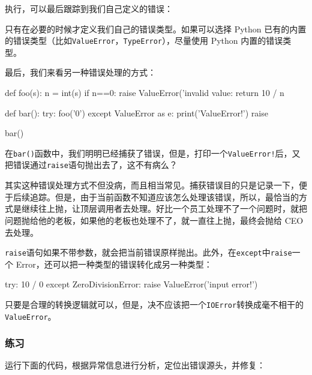 执行，可以最后跟踪到我们自己定义的错误：


只有在必要的时候才定义我们自己的错误类型。如果可以选择 Python
已有的内置的错误类型（比如\texttt{ValueError}，\texttt{TypeError}），尽量使用
Python 内置的错误类型。

最后，我们来看另一种错误处理的方式：

\begin{pythoncode}
def foo(s):
    n = int(s)
    if n==0:
        raise ValueError('invalid value: %
    return 10 / n

def bar():
    try:
        foo('0')
    except ValueError as e:
        print('ValueError!')
        raise

bar()
\end{pythoncode}

在\texttt{bar()}函数中，我们明明已经捕获了错误，但是，打印一个\texttt{ValueError!}后，又把错误通过\texttt{raise}语句抛出去了，这不有病么？

其实这种错误处理方式不但没病，而且相当常见。捕获错误目的只是记录一下，便于后续追踪。但是，由于当前函数不知道应该怎么处理该错误，所以，最恰当的方式是继续往上抛，让顶层调用者去处理。好比一个员工处理不了一个问题时，就把问题抛给他的老板，如果他的老板也处理不了，就一直往上抛，最终会抛给
CEO 去处理。

\texttt{raise}语句如果不带参数，就会把当前错误原样抛出。此外，在\texttt{except}中\texttt{raise}一个
Error，还可以把一种类型的错误转化成另一种类型：

\begin{pythoncode}
try:
    10 / 0
except ZeroDivisionError:
    raise ValueError('input error!')
\end{pythoncode}

只要是合理的转换逻辑就可以，但是，决不应该把一个\texttt{IOError}转换成毫不相干的\texttt{ValueError}。

\hypertarget{ux7ec3ux4e60}{%
\subsubsection{练习}\label{ux7ec3ux4e60}}

运行下面的代码，根据异常信息进行分析，定位出错误源头，并修复：

